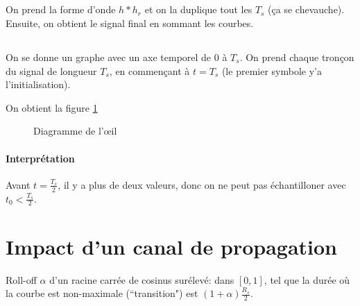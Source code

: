\documentclass{article}
\begin{document}
\subsection{}
On prend la forme d'onde $h \ast h_r$ et on la duplique tout les $T_s$ (ça se chevauche).
Ensuite, on obtient le signal final en sommant les courbes.

\subsection{}
On se donne un graphe avec un axe temporel de $0$ à $T_s$. On prend chaque tronçon du signal de longueur  $T_s$, en commençant à $t=T_s$ (le premier symbole y'a l'initialisation).

On obtient la figure \ref{fig:œil}

 \begin{figure}[h]
    \centering
    \caption{Diagramme de l'œil}
    \label{fig:œil}
\end{figure}

\paragraph{Interprétation}
Avant $t=\frac{T_s}{2}$, il y a plus de deux valeurs, donc on ne peut pas échantilloner avec $t_0 < \frac{T_s}{2}$.

\section{Impact d'un canal de propagation}

Roll-off $\alpha$ d'un racine carrée de cosinus surélevé: dans  $[0, 1]$, tel que la durée où la courbe est non-maximale (``transition") est  $(1+\alpha) \frac{R_s}{2}$.

\subsection{}
\end{document}
